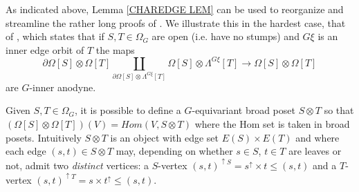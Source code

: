 \documentclass[a4paper,10pt
,draft
]{article}%
\begin{document}
\begin{example}\label{THM71 EX}
	As indicated above, Lemma \ref{CHAREDGE LEM} can be used to
	reorganize and streamline the rather long proofs of \cite[Thms 7.1 and 7.2]{Per17}. We illustrate this in the hardest case, that of \cite[Thm. 7.1(i)]{Per17}, which states that if
	$S,T \in \Omega_G$ are open (i.e. have no stumps) and
	$G \xi$ is an inner edge orbit of $T$ the maps
\begin{equation}\label{THM71 EQ}
	\partial \Omega[S] \otimes \Omega[T]
		\coprod_{\partial \Omega[S] \otimes \Lambda^{G\xi}[T]}
	\Omega[S] \otimes \Lambda^{G\xi}[T]
\to
	 \Omega[S] \otimes \Omega[T]
\end{equation}
are $G$-inner anodyne.

Given $S,T \in \Omega_G$, it is possible \cite[\S 7.1]{Per17} to define a $G$-equivariant broad poset $S \otimes T$
so that 
$\left(\Omega[S] \otimes \Omega[T]\right)(V) = Hom(V,S \otimes T)$
where the Hom set is taken in broad posets.
Intuitively $S \otimes T$ is an object with edge set $E(S) \times E(T)$
and where each edge $(s,t) \in S \otimes T$
may, depending on whether $s \in S$, $t \in T$ are leaves or not,
admit two \textit{distinct} vertices: a $S$-vertex 
$(s,t)^{\uparrow S} = s^{\uparrow} \times t \leq (s,t)$
and a $T$-vertex
$(s,t)^{\uparrow T} = s \times t^{\uparrow} \leq (s,t)$.


\end{example}
\end{document}
